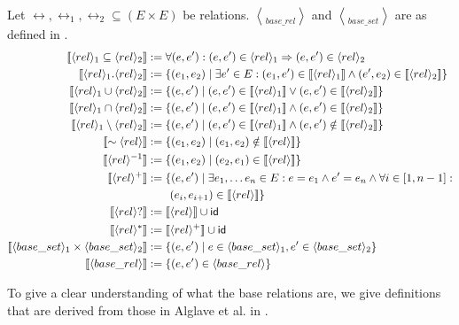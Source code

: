 \documentclass[a4paper,twoside,12pt, english]{article}
\begin{document}
\begin{definition} \label{def:sem}
Let $\rel, \rel_1, \rel_2 \subseteq (E \times E)$ be relations. $\bangle{base\_rel}$ and $\bangle{base\_set}$ are as defined in . \small
\begin{align*}
\llbracket \langle rel \rangle_1 \subseteq \langle rel \rangle_2 \rrbracket &:= \forall (e,e'):(e,e') \in \langle rel \rangle_1 \Rightarrow (e,e') \in \langle rel \rangle_2 \\
\llbracket \langle rel \rangle_1.\langle rel \rangle_2 \rrbracket &:= \{(e_1,e_2) \mid \exists e' \in E: (e_1,e') \in \llbracket \langle rel \rangle_1 \rrbracket \land (e',e_2) \in \llbracket \langle rel \rangle_2 \rrbracket\} \\
\llbracket \langle rel \rangle_1 \cup \langle rel \rangle_2 \rrbracket &:= \{(e,e') \mid (e,e') \in  \llbracket \langle rel \rangle_1 \rrbracket \lor (e,e') \in  \llbracket \langle rel \rangle_2 \rrbracket \} \\
\llbracket \langle rel \rangle_1 \cap \langle rel \rangle_2 \rrbracket &:= \{(e,e') \mid (e,e') \in  \llbracket \langle rel \rangle_1 \rrbracket \land  (e,e') \in  \llbracket \langle rel \rangle_2 \rrbracket\} \\
\llbracket \langle rel \rangle_1 \setminus \langle rel \rangle_2 \rrbracket &:= \{(e,e') \mid (e,e') \in \llbracket \langle rel \rangle_1 \rrbracket \land (e,e') \notin \llbracket \langle rel \rangle_2 \rrbracket\} \\
\llbracket \sim \langle rel \rangle \rrbracket &:= \{(e_1,e_2) \mid (e_1,e_2) \notin \llbracket \langle rel \rangle \rrbracket\} \\
\llbracket \langle rel \rangle^{-1} \rrbracket &:= \{(e_1,e_2) \mid (e_2,e_1) \in \llbracket \langle rel \rangle \rrbracket\} \\
\llbracket \langle rel \rangle^+ \rrbracket &:= \{(e,e') \mid \exists e_1,\dots e_n \in E: e = e_1 \land e'=e_n \land \forall i\in [1,n-1]:\\
& \qquad (e_i,e_{i+1}) \in \llbracket \langle rel \rangle \rrbracket\} \\
\llbracket \langle rel \rangle? \rrbracket &:= \llbracket \langle rel \rangle \rrbracket \cup \textsf{\upshape id} \\
\llbracket \langle rel \rangle^* \rrbracket &:= \llbracket \langle rel \rangle^+ \rrbracket \cup \textsf{\upshape id} \\
\llbracket \langle base\_set \rangle_1 \times \langle base\_set \rangle_2 \rrbracket &:= \{(e,e') \mid e \in \langle base\_set \rangle_1, e' \in \langle base\_set \rangle_2\} \\
\llbracket \langle base\_rel \rangle \rrbracket &:= \{ (e,e') \in \langle base\_rel \rangle \}
\end{align*}
\end{definition}
To give a clear understanding of what the base relations are, we give definitions that are derived from those in Alglave et al. \cite{Alg+16,Alg+14} in .
\end{document}
